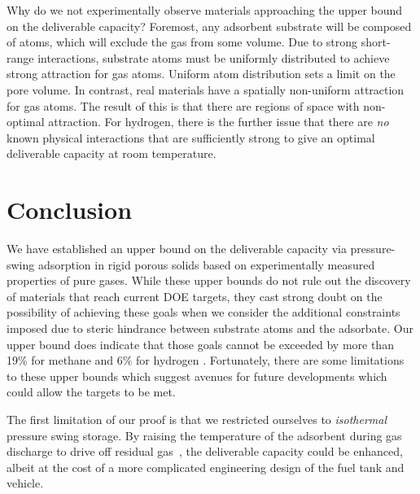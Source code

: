 Why do we not experimentally observe materials approaching the upper bound on the deliverable capacity? Foremost, any adsorbent substrate will be composed of atoms, which will exclude the gas from some volume. Due to strong short-range interactions, substrate atoms must be uniformly distributed to achieve strong attraction for gas atoms. Uniform atom distribution sets a limit on the pore volume.
In contrast, real materials have a spatially non-uniform attraction for gas atoms. The result of this is that there are regions of space with non-optimal attraction. For hydrogen, there is the further issue that there are \emph{no} known physical interactions that are sufficiently strong to give an optimal deliverable capacity at room temperature.

\section{Conclusion}
We have established an upper bound on the deliverable capacity via pressure-swing adsorption in rigid porous solids based on experimentally measured properties of pure gases. While these upper bounds do not rule out the discovery of materials that reach current DOE targets, they cast strong doubt on the possibility of achieving these goals when we consider the additional constraints imposed due to steric hindrance between substrate atoms and the adsorbate. Our upper bound does indicate that those goals cannot be exceeded by more than 19\% for methane and 6\% for hydrogen . Fortunately, there are some limitations to these upper bounds which suggest avenues for future developments which could allow the targets to be met.

The first limitation of our proof is that we restricted ourselves to \emph{isothermal} pressure swing storage. By raising the temperature of the adsorbent during gas discharge to drive off residual gas~\cite{gomez2014exploring}, the deliverable capacity could be enhanced, albeit at the cost of a more complicated engineering design of the fuel tank and vehicle.


